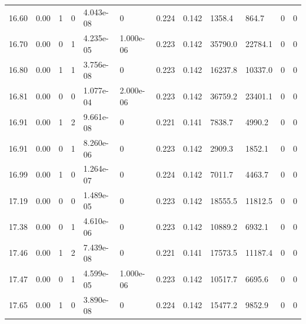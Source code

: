 \documentclass[preview]{standalone}
\begin{document}
{{{\begin{tabular}{L{1.2cm}C{1.2cm} C{0.3cm}C{0.5cm} C{1.4cm}C{1.4cm} C{1.4cm}C{1.4cm} C{1.6cm}C{1.6cm} C{1.6cm}C{1.6cm}}
  16.60  &  0.00  & 1     &  0 &  4.043e-08  & 0  &  0.224&   0.142& 1358.4 & 864.7   &  0 & 0  \\ 
  16.70  &  0.00  & 0     &  1 &  4.235e-05  & 1.000e-06  &  0.223&   0.142& 35790.0 & 22784.1   &  0 & 0  \\ 
  16.80  &  0.00  & 1     &  1 &  3.756e-08  & 0  &  0.223&   0.142& 16237.8 & 10337.0   &  0 & 0  \\ 
  16.81  &  0.00  & 0     &  0 &  1.077e-04  & 2.000e-06  &  0.223&   0.142& 36759.2 & 23401.1   &  0 & 0  \\ 
  16.91  &  0.00  & 1     &  2 &  9.661e-08  & 0  &  0.221&   0.141& 7838.7 & 4990.2   &  0 & 0  \\ 
  16.91  &  0.00  & 0     &  1 &  8.260e-06  & 0  &  0.223&   0.142& 2909.3 & 1852.1   &  0 & 0  \\ 
  16.99  &  0.00  & 1     &  0 &  1.264e-07  & 0  &  0.224&   0.142& 7011.7 & 4463.7   &  0 & 0  \\ 
  17.19  &  0.00  & 0     &  0 &  1.489e-05  & 0  &  0.223&   0.142& 18555.5 & 11812.5   &  0 & 0  \\ 
  17.38  &  0.00  & 0     &  1 &  4.610e-06  & 0  &  0.223&   0.142& 10889.2 & 6932.1   &  0 & 0  \\ 
  17.46  &  0.00  & 1     &  2 &  7.439e-08  & 0  &  0.221&   0.141& 17573.5 & 11187.4   &  0 & 0  \\ 
  17.47  &  0.00  & 0     &  1 &  4.599e-05  & 1.000e-06  &  0.223&   0.142& 10517.7 & 6695.6   &  0 & 0  \\ 
  17.65  &  0.00  & 1     &  0 &  3.890e-08  & 0  &  0.224&   0.142& 15477.2 & 9852.9   &  0 & 0  \\ 
\hline 
\end{tabular} 

}}}
\end{document}
